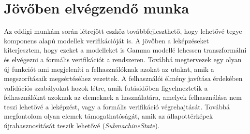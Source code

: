 \section{Jövőben elvégzendő munka}

Az eddigi munkám során létrejött eszköz továbbfejleszthető, hogy lehetővé tegye komponens alapú modellek verifikációját is. A jövőben a leképzéseket kiterjesztem, hogy ezeket a modelleket is Gamma modellé lehessen transzformálni és elvégezni a formális verifikációt a rendszeren. Továbbá megtervezek egy olyan új funkciót ami megjeleníti a felhasználóknak azokat az utakat, amik a megszorításaik megsértéséhez vezettek. A felhasználói élmény javítása érdekében validációs szabályokat hozok létre, amik futásidőben figyelmeztetik a felhasználókat azoknak az elemeknek a használatára, amelyek felhasználása nem teszi lehetővé a leképzést, vagy a formális verifikáció végrehajtását. Továbbá megfontolom olyan elemek támogathatóságát, amik az állapottérképek újrahasznosítását teszik lehetővé (\emph{SubmachineState}).


